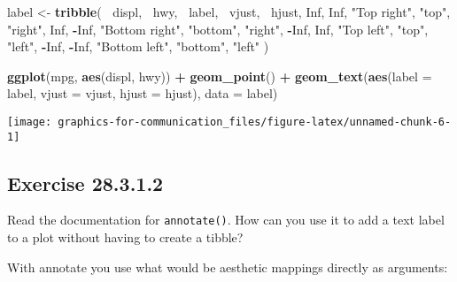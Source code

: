 \documentclass[]{book}
\newenvironment{Shaded}{\begin{snugshade}}{\end{snugshade}}
\newcommand{\DataTypeTok}[1]{\textcolor[rgb]{0.13,0.29,0.53}{#1}}
\newcommand{\KeywordTok}[1]{\textcolor[rgb]{0.13,0.29,0.53}{\textbf{#1}}}
\newcommand{\NormalTok}[1]{#1}
\newcommand{\OperatorTok}[1]{\textcolor[rgb]{0.81,0.36,0.00}{\textbf{#1}}}
\newcommand{\OtherTok}[1]{\textcolor[rgb]{0.56,0.35,0.01}{#1}}
\newcommand{\StringTok}[1]{\textcolor[rgb]{0.31,0.60,0.02}{#1}}
\theoremstyle{plain}
\theoremstyle{remark}
\begin{document}
\begin{Shaded}
\begin{Highlighting}[]
\NormalTok{label <-}\StringTok{ }\KeywordTok{tribble}\NormalTok{(}
  \OperatorTok{~}\NormalTok{displ, }\OperatorTok{~}\NormalTok{hwy, }\OperatorTok{~}\NormalTok{label, }\OperatorTok{~}\NormalTok{vjust, }\OperatorTok{~}\NormalTok{hjust,}
     \OtherTok{Inf}\NormalTok{,  }\OtherTok{Inf}\NormalTok{,    }\StringTok{"Top right"}\NormalTok{, }\StringTok{"top"}\NormalTok{, }\StringTok{"right"}\NormalTok{,}
     \OtherTok{Inf}\NormalTok{, }\OperatorTok{-}\OtherTok{Inf}\NormalTok{,    }\StringTok{"Bottom right"}\NormalTok{, }\StringTok{"bottom"}\NormalTok{, }\StringTok{"right"}\NormalTok{,}
    \OperatorTok{-}\OtherTok{Inf}\NormalTok{,  }\OtherTok{Inf}\NormalTok{,    }\StringTok{"Top left"}\NormalTok{, }\StringTok{"top"}\NormalTok{, }\StringTok{"left"}\NormalTok{,}
    \OperatorTok{-}\OtherTok{Inf}\NormalTok{, }\OperatorTok{-}\OtherTok{Inf}\NormalTok{,    }\StringTok{"Bottom left"}\NormalTok{, }\StringTok{"bottom"}\NormalTok{, }\StringTok{"left"}
\NormalTok{)}

\KeywordTok{ggplot}\NormalTok{(mpg, }\KeywordTok{aes}\NormalTok{(displ, hwy)) }\OperatorTok{+}
\StringTok{  }\KeywordTok{geom_point}\NormalTok{() }\OperatorTok{+}
\StringTok{  }\KeywordTok{geom_text}\NormalTok{(}\KeywordTok{aes}\NormalTok{(}\DataTypeTok{label =}\NormalTok{ label, }\DataTypeTok{vjust =}\NormalTok{ vjust, }\DataTypeTok{hjust =}\NormalTok{ hjust), }\DataTypeTok{data =}\NormalTok{ label)}
\end{Highlighting}
\end{Shaded}

\begin{center}\texttt{[image: graphics-for-communication\_files/figure-latex/unnamed-chunk-6-1]} \end{center}

\hypertarget{exercise-28.3.1.2}{%
\subsection*{\texorpdfstring{Exercise
{28.3.1.2}}{Exercise 28.3.1.2}}\label{exercise-28.3.1.2}}

Read the documentation for \texttt{annotate()}. How can you use it to
add a text label to a plot without having to create a tibble?

With annotate you use what would be aesthetic mappings directly as
arguments:
\end{document}
